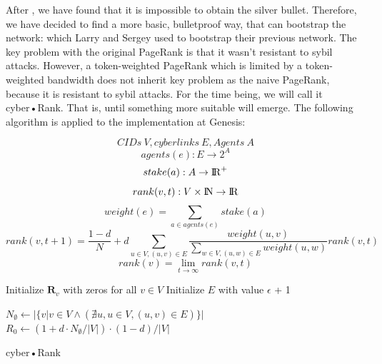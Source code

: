 \documentclass[8pt,oneside]{amsart}
\newcommand{\linkred}[2]{\href{#1}{\color{red}{#2}}}
\begin{document}
After \linkred{https://arxiv.org/pdf/1709.09002.pdf}{some research}, we have found that it is impossible to obtain the silver bullet. Therefore, we have decided to find a more basic, bulletproof way, that can bootstrap the network: \linkred{http://ilpubs.stanford.edu:8090/422/1/1999-66.pdf}{the rank} which Larry and Sergey used to bootstrap their previous network. The key problem with the original PageRank is that it wasn't resistant to sybil attacks. However, a token-weighted PageRank which is limited by a token-weighted bandwidth does not inherit key problem as the naive PageRank, because it is resistant to sybil attacks. For the time being, we will call it cyber•Rank. That is, until something more suitable will emerge. The following algorithm is applied to the implementation at Genesis:

$$ CIDs \ V, cyberlinks \ E, Agents \ A $$
$$agents(e): E \rightarrow 2^{A}$$
$$stake(a): A \rightarrow {\rm I\!R}^+ $$
$$rank(v, t): V \times {\rm I\!N} \rightarrow {\rm I\!R} $$
$$weight(e) = \sum\limits_{a \in agents(e)}{stake(a)}$$
$$rank(v, t + 1) = \frac{1 - d}{N} + d\sum\limits_{u \in V, (u, v) \in E}{\frac{weight(u, v)}{\sum_{w \in V, (u, w) \in E}{weight(u, w)}}rank(v, t)} $$
$$rank(v) = \lim\limits_{t \rightarrow \infty} rank(v, t)$$
\begin{algorithm}


\BlankLine
Initialize $\textbf{R}_{v}$ with zeros for all $v \in V$\;
Initialize $E$ with value $\epsilon$ + 1\;

\BlankLine
$N_{\emptyset} \leftarrow |\{v|v \in V \land (\nexists u, u \in V, (u, v) \in E )\}|$ \;
$R_{0} \leftarrow (1 + d \cdot N_{\emptyset} / |V|) \cdot (1 - d) / |V| $ \;

\BlankLine
{}

\caption{cyber•Rank}\label{algo_disjdecomp}
\end{algorithm}\
\end{document}
